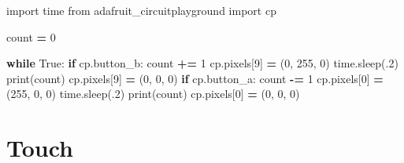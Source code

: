 \documentclass[
]{book}
\newenvironment{Shaded}{\begin{snugshade}}{\end{snugshade}}
\newcommand{\BuiltInTok}[1]{#1}
\newcommand{\ControlFlowTok}[1]{\textcolor[rgb]{0.13,0.29,0.53}{\textbf{#1}}}
\newcommand{\DecValTok}[1]{\textcolor[rgb]{0.00,0.00,0.81}{#1}}
\newcommand{\ImportTok}[1]{#1}
\newcommand{\NormalTok}[1]{#1}
\newcommand{\OperatorTok}[1]{\textcolor[rgb]{0.81,0.36,0.00}{\textbf{#1}}}
\newcommand{\VariableTok}[1]{\textcolor[rgb]{0.00,0.00,0.00}{#1}}
\begin{document}
\begin{Shaded}
\begin{Highlighting}[]
\ImportTok{import}\NormalTok{ time}
\ImportTok{from}\NormalTok{ adafruit_circuitplayground }\ImportTok{import}\NormalTok{ cp}

\NormalTok{count }\OperatorTok{=} \DecValTok{0}

\ControlFlowTok{while} \VariableTok{True}\NormalTok{:}
    \ControlFlowTok{if}\NormalTok{ cp.button_b:}
\NormalTok{        count }\OperatorTok{+=} \DecValTok{1}
\NormalTok{        cp.pixels[}\DecValTok{9}\NormalTok{] }\OperatorTok{=}\NormalTok{ (}\DecValTok{0}\NormalTok{, }\DecValTok{255}\NormalTok{, }\DecValTok{0}\NormalTok{)}
\NormalTok{        time.sleep(.}\DecValTok{2}\NormalTok{)}
        \BuiltInTok{print}\NormalTok{(count)}
\NormalTok{        cp.pixels[}\DecValTok{9}\NormalTok{] }\OperatorTok{=}\NormalTok{ (}\DecValTok{0}\NormalTok{, }\DecValTok{0}\NormalTok{, }\DecValTok{0}\NormalTok{)}
    \ControlFlowTok{if}\NormalTok{ cp.button_a:}
\NormalTok{        count }\OperatorTok{-=} \DecValTok{1}
\NormalTok{        cp.pixels[}\DecValTok{0}\NormalTok{] }\OperatorTok{=}\NormalTok{ (}\DecValTok{255}\NormalTok{, }\DecValTok{0}\NormalTok{, }\DecValTok{0}\NormalTok{)}
\NormalTok{        time.sleep(.}\DecValTok{2}\NormalTok{)}
        \BuiltInTok{print}\NormalTok{(count)}
\NormalTok{        cp.pixels[}\DecValTok{0}\NormalTok{] }\OperatorTok{=}\NormalTok{ (}\DecValTok{0}\NormalTok{, }\DecValTok{0}\NormalTok{, }\DecValTok{0}\NormalTok{)}
\end{Highlighting}
\end{Shaded}

\hypertarget{touch}{%
\chapter{Touch}\label{touch}}
\end{document}
